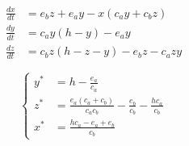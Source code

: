 \documentclass[twocolumn,aps,prl]{revtex4-1}
\begin{document}
$$
\begin{aligned}
    \frac{d     x}{d t} &= e_{b} z +e_{a}  y -x\left(c_{a}  y +c_{b} z \right) \\
    \frac{d  y }{d t} &= c_{a}  y \left(h- y \right)-e_{a}  y  \\
    \frac{d z }{d t} &= c_{b} z \left(h-z - y \right)-e_{b} z -c_{a} z   y  
\end{aligned} 
$$




\begin{equation}
    \left\{
    \begin{aligned}
        y^{*} &= h - \frac{e_{a}}{c_{a}} \\
        z^{*} &= \frac{e_{a} \left( c_{a} + c_{b} \right)}{c_{a} c_{b}} - \frac{e_{b}}{c_{b}} - \frac{h c_{a}}{c_{b}} \\
        x^{*} &= \frac{h c_{a} - e_{a} + e_{b}}{c_{b}}
    \end{aligned}
    \right.
\end{equation}
\end{document}
